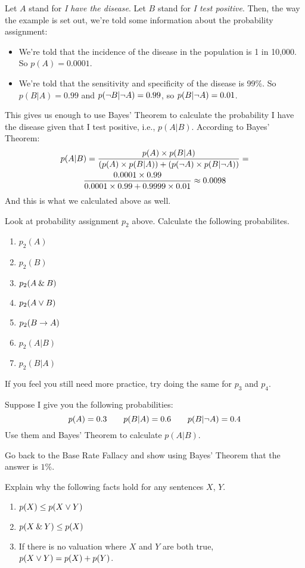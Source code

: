 Let $A$ stand for \emph{I have the disease}. Let $B$ stand for \emph{I test positive}. Then, the way the example is set out, we're told some information about the probability assignment:
\begin{itemize}
\item We're told that the incidence of the disease in the population is 1 in 10,000. So $p(A) = 0.0001$.
\item We're told that the sensitivity and specificity of the disease is 99\%. So $p(B | A) = 0.99$ and $p(\neg B | \neg A) = 0.99$, so $p(B | \neg A) = 0.01$.
\end{itemize}
This gives us enough to use Bayes' Theorem to calculate the probability I have the disease given that I test positive, i.e., $p(A | B)$. According to Bayes' Theorem:
\begin{multline*}
p(A | B) = \frac{p(A) \times p(B|A)}{(p(A) \times p(B|A)) + (p(\neg A)\times p(B|\neg A))} = \\ \frac{0.0001 \times 0.99}{0.0001 \times 0.99 + 0.9999 \times 0.01} \approx 0.0098
\end{multline*}
And this is what we calculated above as well.

\practiceproblems

\problempart Look at probability assignment $p_2$ above. Calculate the following probabilites.
\begin{enumerate}
\item $p_2(A)$
\item $p_2(B)$
\item $p_2(A\mathbin{\&}  B)$
\item $p_2(A \vee B)$
\item $p_2(B\rightarrow A)$
\item $p_2(A | B)$
\item $p_2(B | A)$
\end{enumerate}
If you feel you still need more practice, try doing the same for $p_3$ and $p_4$.



\problempart Suppose I give you the following probabilities:
\[
p(A) = 0.3 \qquad p(B | A) = 0.6 \qquad p(B | \neg A) = 0.4
\]
Use them and Bayes' Theorem to calculate $p(A | B)$.

\problempart Go back to the Base Rate Fallacy and show using Bayes' Theorem that the answer is $1\%$. 

\problempart Explain why the following facts hold for any sentences $X$, $Y$.
\begin{enumerate}
\item $p(X) \leq p(X \vee Y)$
\item $p(X\mathbin{\&} Y) \leq p(X)$
\item If there is no valuation where $X$ and $Y$ are both true, $p(X \vee Y) = p(X) + p(Y)$.
\end{enumerate}

